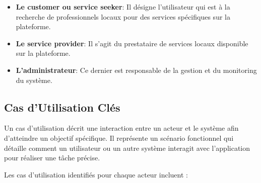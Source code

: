 \vspace{0.39cm}

\begin{itemize}
    \item \textbf{Le customer ou service seeker}: Il désigne l'utilisateur qui est à la recherche de professionnels locaux pour des services spécifiques sur la plateforme. 
    \item \textbf{Le service provider}: Il s'agit du prestataire de services locaux disponible sur la plateforme.
    \item \textbf{L'administrateur}: Ce dernier est responsable de la gestion et du monitoring du système.
\end{itemize}

\subsection{Cas d’Utilisation Clés}

Un cas d’utilisation décrit une interaction entre un acteur et le système afin d’atteindre un objectif spécifique. Il représente un scénario fonctionnel qui détaille comment un utilisateur ou un autre système interagit avec l’application pour réaliser une tâche précise.

\vspace{0.39cm}

Les cas d'utilisation identifiés pour chaque acteur incluent :

\vspace{0.39cm}

